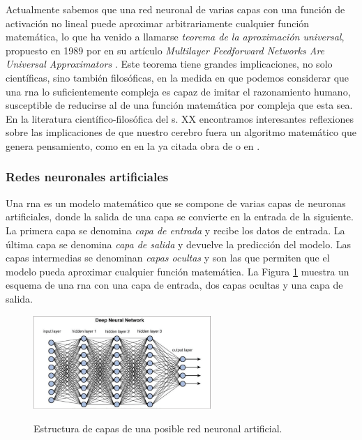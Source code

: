 Actualmente sabemos que una red neuronal de varias capas con una función de activación no lineal puede aproximar arbitrariamente cualquier función matemática, lo que ha venido a llamarse \emph{teorema de la aproximación universal}, propuesto en 1989 por \citeauthor{hornikMultilayerFeedforwardNetworks1989} en su artículo \emph{Multilayer Feedforward Networks Are Universal Approximators} \citep{hornikMultilayerFeedforwardNetworks1989}. Este teorema tiene grandes implicaciones, no solo científicas, sino también filosóficas, en la medida en que podemos considerar que una \gls{rna} lo suficientemente compleja es capaz de imitar el razonamiento humano, susceptible de reducirse al de una función matemática por compleja que esta sea. En la literatura científico-filosófica del s. XX encontramos interesantes reflexiones sobre las implicaciones de que nuestro cerebro fuera un algoritmo matemático que genera pensamiento, como en en la ya citada obra de \cite{penroseNuevaMenteEmperador2015} o en \cite{searleMentesCerebrosCiencia1985}.


\subsubsection{Redes neuronales artificiales}
Una \gls{rna} es un modelo matemático que se compone de varias capas de neuronas artificiales, donde la salida de una capa se convierte en la entrada de la siguiente. La primera capa se denomina \emph{capa de entrada} y recibe los datos de entrada. La última capa se denomina \emph{capa de salida} y devuelve la predicción del modelo. Las capas intermedias se denominan \emph{capas ocultas} y son las que permiten que el modelo pueda aproximar cualquier función matemática. La Figura \ref{fig:deep_neural_network} muestra un esquema de una \gls{rna} con una capa de entrada, dos capas ocultas y una capa de salida.


\begin{figure}[H]
    \caption[Estructura de capas de una posible red neuronal artificial]{Estructura de capas de una posible red neuronal artificial.}
    \centering
    \includegraphics[width=0.6\textwidth]{./figuras/Deep_neural_network.png}
    \label{fig:deep_neural_network}
\end{figure}

